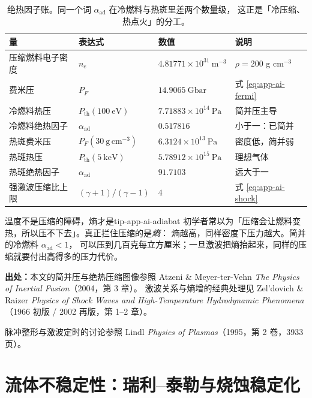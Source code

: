 \begin{table}[htbp]
\centering
\small
\caption{绝热因子账。同一个词 $\alpha_{\mathrm{ad}}$ 在冷燃料与热斑里差两个数量级，
这正是「冷压缩、热点火」的分工。}
\label{tab:app-ai-adiabat}
\begin{tabular}{p{4.2cm}p{3.2cm}p{3.0cm}p{3.0cm}}
\toprule
量 & 表达式 & 数值 & 说明 \\
\midrule
压缩燃料电子密度 & $n_e$ & $4.81771\times10^{31}\ \mathrm{m^{-3}}$ & $\rho = 200$ g cm$^{-3}$ \\
费米压 & $P_F$ & $14.9065\ \mathrm{Gbar}$ & 式 \eqref{eq:app-ai-fermi} \\
冷燃料热压 & $P_{\mathrm{th}}(100\ \mathrm{eV})$ & $7.71883\times10^{14}\ \mathrm{Pa}$ & 简并压主导 \\
冷燃料绝热因子 & $\alpha_{\mathrm{ad}}$ & $0.517816$ & 小于一：已简并 \\
热斑费米压 & $P_F(30\ \mathrm{g\,cm^{-3}})$ & $6.3124\times10^{13}\ \mathrm{Pa}$ & 密度低，简并弱 \\
热斑热压 & $P_{\mathrm{th}}(5\ \mathrm{keV})$ & $5.78912\times10^{15}\ \mathrm{Pa}$ & 理想气体 \\
热斑绝热因子 & $\alpha_{\mathrm{ad}}$ & $91.7103$ & 远大于一 \\
强激波压缩比上限 & $(\gamma+1)/(\gamma-1)$ & $4$ & 式 \eqref{eq:app-ai-shock} \\
\bottomrule
\end{tabular}

\end{table}

\begin{tip}{温度不是压缩的障碍，熵才是}{tip-app-ai-adiabat}
初学者常以为「压缩会让燃料变热，所以压不下去」。真正拦住压缩的是\emph{熵}：
熵越高，同样密度下压力越大。简并的冷燃料 $\alpha_{\mathrm{ad}} < 1$，
可以压到几百克每立方厘米；一旦激波把熵抬起来，同样的压缩就要付出高得多的压力代价。
\end{tip}

{\footnotesize
\textbf{出处：}本文的简并压与绝热压缩图像参照 Atzeni \& Meyer-ter-Vehn
\emph{The Physics of Inertial Fusion}（2004，第 3 章）。
激波关系与熵增的经典处理见
Zel'dovich \& Raizer \emph{Physics of Shock Waves and High-Temperature Hydrodynamic
Phenomena}（1966 初版 / 2002 再版，第 1--2 章）。

脉冲整形与激波定时的讨论参照
Lindl \emph{Physics of Plasmas}（1995，第 2 卷，3933 页）。
}

\section{流体不稳定性：瑞利--泰勒与烧蚀稳定化}
\label{sec:app-ai-rt}

